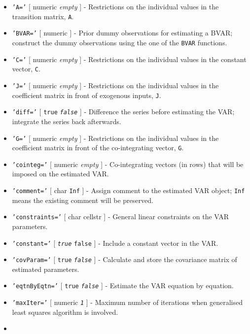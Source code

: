 \begin{itemize}
\item
  \texttt{'A='} {[} numeric \textbar{} \emph{empty} {]} - Restrictions
  on the individual values in the transition matrix, \texttt{A}.
\item
  \texttt{'BVAR='} {[} numeric {]} - Prior dummy observations for
  estimating a BVAR; construct the dummy observations using the one of
  the \texttt{BVAR} functions.
\item
  \texttt{'C='} {[} numeric \textbar{} \emph{empty} {]} - Restrictions
  on the individual values in the constant vector, \texttt{C}.
\item
  \texttt{'J='} {[} numeric \textbar{} \emph{empty} {]} - Restrictions
  on the individual values in the coefficient matrix in front of
  exogenous inputs, \texttt{J}.
\item
  \texttt{'diff='} {[} \texttt{true} \textbar{} \emph{\texttt{false}}
  {]} - Difference the series before estimating the VAR; integrate the
  series back afterwards.
\item
  \texttt{'G='} {[} numeric \textbar{} \emph{empty} {]} - Restrictions
  on the individual values in the coefficient matrix in front of the
  co-integrating vector, \texttt{G}.
\item
  \texttt{'cointeg='} {[} numeric \textbar{} \emph{empty} {]} -
  Co-integrating vectors (in rows) that will be imposed on the estimated
  VAR.
\item
  \texttt{'comment='} {[} char \textbar{} \texttt{Inf} {]} - Assign
  comment to the estimated VAR object; \texttt{Inf} means the existing
  comment will be preserved.
\item
  \texttt{'constraints='} {[} char \textbar{} cellstr {]} - General
  linear constraints on the VAR parameters.
\item
  \texttt{'constant='} {[} \emph{\texttt{true}} \textbar{}
  \texttt{false} {]} - Include a constant vector in the VAR.
\item
  \texttt{'covParam='} {[} \texttt{true} \textbar{}
  \emph{\texttt{false}} {]} - Calculate and store the covariance matrix
  of estimated parameters.
\item
  \texttt{'eqtnByEqtn='} {[} \texttt{true} \textbar{}
  \emph{\texttt{false}} {]} - Estimate the VAR equation by equation.
\item
  \texttt{'maxIter='} {[} numeric \textbar{} \emph{\texttt{1}} {]} -
  Maximum number of iterations when generalised least squares algorithm
  is involved.
\item

\end{itemize}

